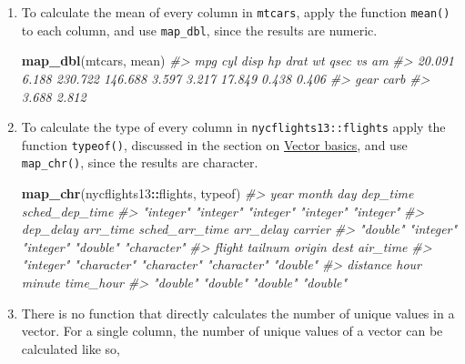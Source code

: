 \documentclass[]{book}
\newenvironment{Shaded}{\begin{snugshade}}{\end{snugshade}}
\newcommand{\CommentTok}[1]{\textcolor[rgb]{0.56,0.35,0.01}{\textit{#1}}}
\newcommand{\KeywordTok}[1]{\textcolor[rgb]{0.13,0.29,0.53}{\textbf{#1}}}
\newcommand{\NormalTok}[1]{#1}
\newcommand{\OperatorTok}[1]{\textcolor[rgb]{0.81,0.36,0.00}{\textbf{#1}}}
\theoremstyle{plain}
\theoremstyle{remark}
\begin{document}
\begin{enumerate}
\def\labelenumi{\arabic{enumi}.}
\item
  To calculate the mean of every column in \texttt{mtcars}, apply the
  function \texttt{mean()} to each column, and use \texttt{map\_dbl},
  since the results are numeric.

\begin{Shaded}
\begin{Highlighting}[]
\KeywordTok{map_dbl}\NormalTok{(mtcars, mean)}
\CommentTok{#>     mpg     cyl    disp      hp    drat      wt    qsec      vs      am }
\CommentTok{#>  20.091   6.188 230.722 146.688   3.597   3.217  17.849   0.438   0.406 }
\CommentTok{#>    gear    carb }
\CommentTok{#>   3.688   2.812}
\end{Highlighting}
\end{Shaded}
\item
  To calculate the type of every column in
  \texttt{nycflights13::flights} apply the function \texttt{typeof()},
  discussed in the section on
  \href{http://r4ds.had.co.nz/vectors.html\#vector-basics}{Vector
  basics}, and use \texttt{map\_chr()}, since the results are character.

\begin{Shaded}
\begin{Highlighting}[]
\KeywordTok{map_chr}\NormalTok{(nycflights13}\OperatorTok{::}\NormalTok{flights, typeof)}
\CommentTok{#>           year          month            day       dep_time sched_dep_time }
\CommentTok{#>      "integer"      "integer"      "integer"      "integer"      "integer" }
\CommentTok{#>      dep_delay       arr_time sched_arr_time      arr_delay        carrier }
\CommentTok{#>       "double"      "integer"      "integer"       "double"    "character" }
\CommentTok{#>         flight        tailnum         origin           dest       air_time }
\CommentTok{#>      "integer"    "character"    "character"    "character"       "double" }
\CommentTok{#>       distance           hour         minute      time_hour }
\CommentTok{#>       "double"       "double"       "double"       "double"}
\end{Highlighting}
\end{Shaded}
\item
  There is no function that directly calculates the number of unique
  values in a vector. For a single column, the number of unique values
  of a vector can be calculated like so,

\begin{Shaded}
\end{Shaded}


\end{enumerate}
\end{document}
